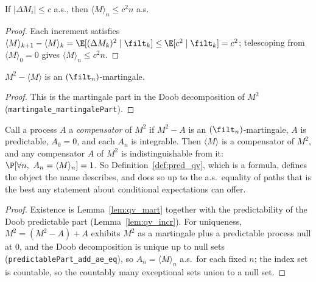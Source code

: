 \begin{lemma}\label{lem:qv_linear_bound}
\leanok
{}
If $|\Delta M_i|\le c$ a.s., then $\langle M\rangle_n \le c^2 n$ a.s.
\end{lemma}

\begin{proof}\leanok
Each increment satisfies $\langle M\rangle_{k+1}-\langle M\rangle_k
= \E[(\Delta M_k)^2\mid\filt_k] \le \E[c^2\mid\filt_k] = c^2$; telescoping from
$\langle M\rangle_0 = 0$ gives $\langle M\rangle_n \le c^2 n$.
\end{proof}

\begin{lemma}\label{lem:qv_mart}
\leanok
{}
$M^2 - \langle M\rangle$ is an $(\filt_n)$-martingale.
\end{lemma}

\begin{proof}\leanok
This is the martingale part in the Doob decomposition of $M^2$
(\texttt{martingale\_martingalePart}).
\end{proof}

\begin{lemma}\label{lem:qv_unique}
\leanok
{}
Call a process $A$ a \emph{compensator} of $M^2$ if $M^2 - A$ is an $(\filt_n)$-martingale, $A$ is
predictable, $A_0 = 0$, and each $A_n$ is integrable. Then $\langle M\rangle$ is a compensator of
$M^2$, and any compensator $A$ of $M^2$ is indistinguishable from it:
$\P[\forall n,\ A_n = \langle M\rangle_n] = 1$. So Definition~\ref{def:pred_qv}, which is a
formula, defines the object the name describes, and does so up to the a.s.\ equality of paths that
is the best any statement about conditional expectations can offer.
\end{lemma}

\begin{proof}\leanok
{}
Existence is Lemma~\ref{lem:qv_mart} together with the predictability of the Doob predictable part
(Lemma~\ref{lem:qv_incr}). For uniqueness, $M^2 = (M^2 - A) + A$ exhibits $M^2$ as a martingale
plus a predictable process null at $0$, and the Doob decomposition is unique up to null sets
(\texttt{predictablePart\_add\_ae\_eq}), so $A_n = \langle M\rangle_n$ a.s.\ for each fixed $n$;
the index set is countable, so the countably many exceptional sets union to a null set.
\end{proof}

